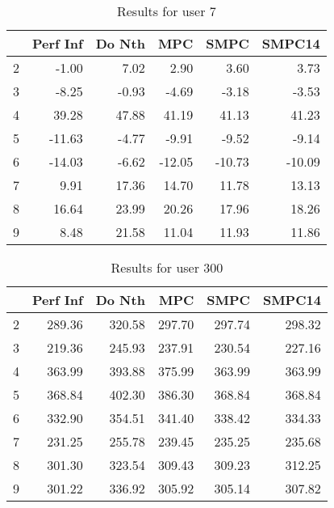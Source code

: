 \documentclass[11pt]{article}
\theoremstyle{definition}
\begin{document}
\begin{table}
\centering
\begin{tabular}{lrrrrr}
	\toprule
	{} &  Perf Inf &  Do Nth &    MPC &   SMPC &  SMPC14 \\
	\midrule
	2 &     -1.00 &    7.02 &   2.90 &   3.60 &    3.73 \\
	3 &     -8.25 &   -0.93 &  -4.69 &  -3.18 &   -3.53 \\
	4 &     39.28 &   47.88 &  41.19 &  41.13 &   41.23 \\
	5 &    -11.63 &   -4.77 &  -9.91 &  -9.52 &   -9.14 \\
	6 &    -14.03 &   -6.62 & -12.05 & -10.73 &  -10.09 \\
	7 &      9.91 &   17.36 &  14.70 &  11.78 &   13.13 \\
	8 &     16.64 &   23.99 &  20.26 &  17.96 &   18.26 \\
	9 &      8.48 &   21.58 &  11.04 &  11.93 &   11.86 \\
	\bottomrule
\end{tabular}
\caption{Results for user 7}
\label{tab:u7}
\end{table}

\begin{table}
\centering
\begin{tabular}{lrrrrr}
	\toprule
	{} &  Perf Inf &  Do Nth &     MPC &    SMPC &  SMPC14 \\
	\midrule
	2 &    289.36 &  320.58 &  297.70 &  297.74 &  298.32 \\
	3 &    219.36 &  245.93 &  237.91 &  230.54 &  227.16 \\
	4 &    363.99 &  393.88 &  375.99 &  363.99 &  363.99 \\
	5 &    368.84 &  402.30 &  386.30 &  368.84 &  368.84 \\
	6 &    332.90 &  354.51 &  341.40 &  338.42 &  334.33 \\
	7 &    231.25 &  255.78 &  239.45 &  235.25 &  235.68 \\
	8 &    301.30 &  323.54 &  309.43 &  309.23 &  312.25 \\
	9 &    301.22 &  336.92 &  305.92 &  305.14 &  307.82 \\
	\bottomrule
\end{tabular}
\caption{Results for user 300}
\label{tab:u300}
\end{table}
\end{document}
